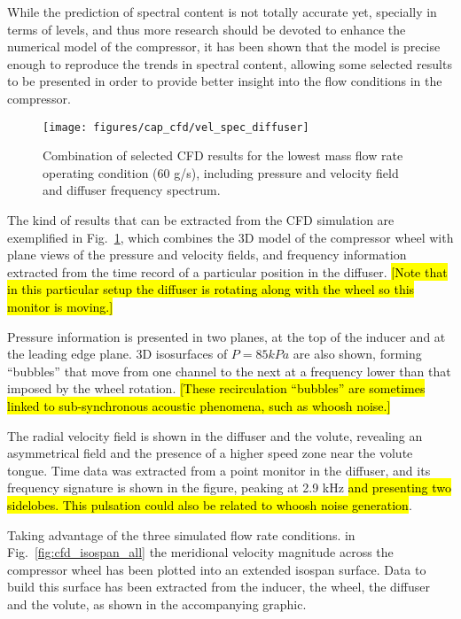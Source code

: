 While the prediction of spectral content is not totally accurate yet, specially in terms of levels, and thus more research should be devoted to enhance the numerical model of the compressor, it has been shown that the model is precise enough to reproduce the trends in spectral content, allowing some selected results to be presented in order to provide better insight into the flow conditions in the compressor.

\begin{figure}[htb!]
\centering
\texttt{[image: figures/cap\_cfd/vel\_spec\_diffuser]}
\caption{Combination of selected CFD results for the lowest mass flow rate operating condition (60 g/s), including pressure and velocity field and diffuser frequency spectrum.}
\label{fig:vel_spec_diffuser}
\end{figure}

The kind of results that can be extracted from the CFD simulation are exemplified in Fig.~\ref{fig:vel_spec_diffuser}, which combines the 3D model of the compressor wheel with plane views of the pressure and velocity fields, and frequency information extracted from the time record of a particular position in the diffuser. \hl{[Note that in this particular setup the diffuser is rotating along with the wheel so this monitor is moving.]}

Pressure information is presented in two planes, at the top of the inducer and at the leading edge plane. 3D isosurfaces of $P = 85 kPa$ are also shown, forming ``bubbles'' that move from one channel to the next at a frequency lower than that imposed by the wheel rotation. \hl{[These recirculation ``bubbles'' are sometimes linked to sub-synchronous acoustic phenomena, such as whoosh noise.]}

The radial velocity field is shown in the diffuser and the volute, revealing an asymmetrical field and the presence of a higher speed zone near the volute tongue. Time data was extracted from a point monitor in the diffuser, and its frequency signature is shown in the figure, peaking at 2.9 kHz \hl{and presenting two sidelobes. This pulsation could also be related to whoosh noise generation}.

Taking advantage of the three simulated flow rate conditions. in Fig.~\ref{fig:cfd_isospan_all} the meridional velocity magnitude across the compressor wheel has been plotted into an extended isospan surface. Data to build this surface has been extracted from the inducer, the wheel, the diffuser and the volute, as shown in the accompanying graphic. 

